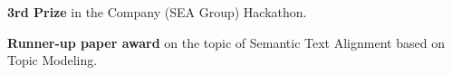 \begin{cvempty} %
  \begin{cvitems} %
    \item {\textbf{3rd Prize} in the Company (SEA Group) Hackathon.\hfill{}}
    \item {\textbf{Runner-up paper award} on the topic of Semantic Text Alignment based on Topic Modeling.\hfill{}}
  \end{cvitems}

\end{cvempty}

